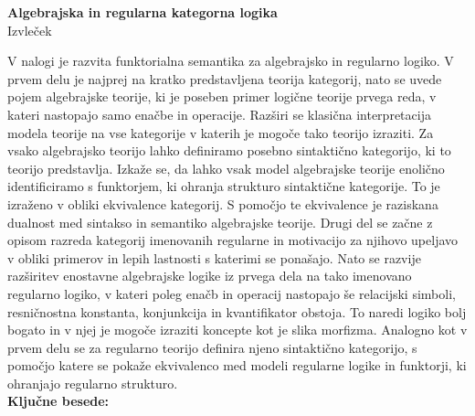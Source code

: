 \documentclass[12pt,a4paper]{book}
\begin{document}
%
\frontmatter%

\cleardoublepage
\begin{center}
{\bf Algebrajska in regularna kategorna logika}\\[3mm]
{\sc  Izvleček}
\end{center}
\vspace{10mm}
V nalogi je razvita funktorialna semantika za algebrajsko in regularno logiko.
V prvem delu je najprej na kratko predstavljena teorija kategorij, nato se uvede
pojem algebrajske teorije, ki je poseben primer logične teorije prvega reda, v kateri
nastopajo samo enačbe in operacije. Razširi se klasična interpretacija modela teorije
na vse kategorije v katerih je mogoče tako teorijo izraziti.
Za vsako algebrajsko teorijo lahko definiramo posebno sintaktično kategorijo,
ki to teorijo predstavlja. Izkaže se, da lahko vsak model algebrajske teorije
enolično identificiramo s funktorjem, ki ohranja strukturo sintaktične kategorije.
To je izraženo v obliki ekvivalence kategorij. S pomočjo te ekvivalence je raziskana
dualnost med sintakso in semantiko algebrajske teorije.
Drugi del se začne z opisom razreda kategorij imenovanih regularne in motivacijo
za njihovo upeljavo v obliki primerov in lepih lastnosti s katerimi se ponašajo.
Nato se razvije razširitev enostavne algebrajske logike iz prvega dela na tako imenovano
regularno logiko, v kateri poleg enačb in operacij nastopajo še relacijski simboli,
resničnostna konstanta, konjunkcija in kvantifikator obstoja. To naredi logiko
bolj bogato in v njej je mogoče izraziti koncepte kot je slika morfizma.
Analogno kot v prvem delu se za regularno teorijo definira njeno sintaktično kategorijo,
s pomočjo katere se pokaže ekvivalenco med modeli regularne logike in funktorji, ki
ohranjajo regularno strukturo.\\[10mm]
{\bf Ključne besede:} \tkeywords \\[3mm]
\cleardoublepage
\end{document}
